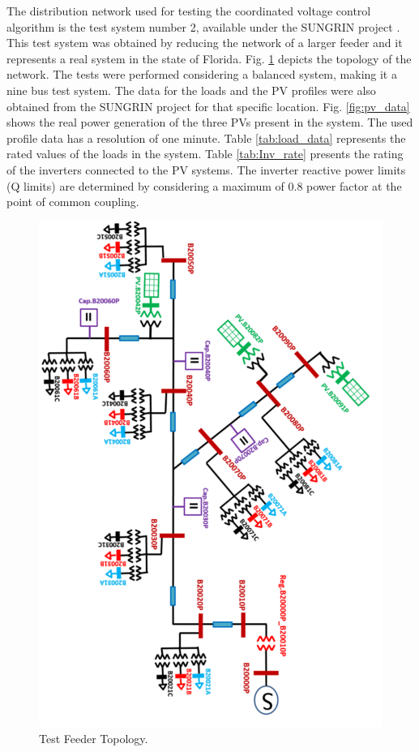 The distribution network used for testing the coordinated voltage control algorithm is the test system number 2, available under the SUNGRIN project \cite{SG}. This test system was obtained by reducing the network of a larger feeder and it represents a real system in the state of Florida. Fig. \ref{fig:Feeder2} \cite{SG} depicts the topology of the network. The tests were performed considering a balanced system, making it a nine bus test system. The data for the loads and the PV profiles were also obtained from the SUNGRIN project for that specific location. Fig. \ref{fig:pv_data} shows the real power generation of the three PVs present in the system. The used profile data has a resolution of one minute. Table \ref{tab:load_data} represents the rated values of the loads in the system. Table \ref{tab:Inv_rate} presents the rating of the inverters connected to the PV systems. The inverter reactive power limits (Q limits) are determined by considering a maximum of 0.8 power factor at the point of common coupling. 

\begin{figure}[!h]
\centering
\includegraphics[width=0.85\linewidth]{figs/CVC/feeder_r.png}
\caption{Test Feeder Topology.}
\label{fig:Feeder2}
\end{figure}

